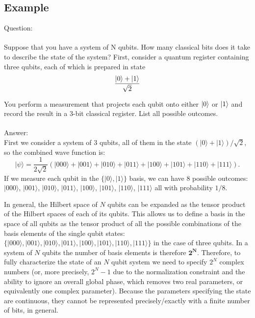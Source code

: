 \documentclass[12pt]{article}
\begin{document}
\subsection{Example}

Question:
\\\\
Suppose that you have a system of N qubits. How many classical bits does it take to describe the state of the system? First, consider a quantum register containing three qubits, each of which is prepared in state
\begin{equation}
    \frac{\ket{0} +\ket{1}  }   {\sqrt{2}}
\end{equation}

You perform a measurement that projects each qubit onto either $\ket{0}$ or  $\ket{1}$ and
record the result in a 3-bit classical register. List all possible outcomes.
\\
\\

Answer:\\

First we consider a system of 3 qubits, all of them in the state $(|0\rangle +|1\rangle)/\sqrt{2}$, so the combined wave function is:
\begin{equation}
    |\psi \rangle = \frac{1}{2\sqrt{2}}\left(|000\rangle+|001\rangle+|010\rangle+|011\rangle+|100\rangle+|101\rangle+|110\rangle+|111\rangle \right).
\end{equation}
If we measure each qubit in the $\{|0\rangle,|1\rangle\}$ basis, we can have 8 possible outcomes: $|000\rangle$, $|001\rangle$, $|010\rangle$, $|011\rangle$, $|100\rangle$, $|101\rangle$, $|110\rangle$, $|111\rangle$ all with probability $1/8$.

In general, the Hilbert space of $N$ qubits can be expanded as the tensor product of the Hilbert spaces of each of its qubits. This allows us to define a basis in the space of all qubits as the tensor product of all the possible combinations of the basis elements of the single qubit states: $\{|000\rangle,|001\rangle,|010\rangle,|011\rangle,|100\rangle,|101\rangle,|110\rangle,|111\rangle\}$ in the case of three qubits. In a system of $N$ qubits the number of basis elements is therefore $\boldsymbol{2^N}$. Therefore, to fully characterize the state of an $N$ qubit system we need to specify $2^N$ complex numbers (or, more precisely, $2^{N} - 1$ due to the normalization constraint and the ability to ignore an overall global phase, which removes two real parameters, or equivalently one complex parameter). Because the parameters specifying the state are continuous, they cannot be represented precisely/exactly with a finite number of bits, in general.
\end{document}
